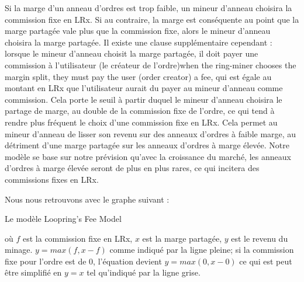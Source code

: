 \documentclass[UTF8,nofonts]{article}
\makeatletter
\newenvironment{figurehere}
 {\def\@captype{figure}}
 {}
\makeatother
\begin{document}
\begin{multicols}{2}
Si la marge d'un anneau d'ordres est trop faible, un mineur d'anneau choisira la commission fixe en LRx. Si au contraire, la marge est conséquente au point que la marge partagée vale plus que la commission fixe, alors le mineur d'anneau choisira la marge partagée. Il existe une clause supplémentaire cependant : lorsque le mineur d'anneau choisit la marge partagée, il doit payer une commission à l'utilisateur (le créateur de l'ordre)when the ring-miner chooses the margin split, they must pay the user (order creator) a fee, qui est égale au montant en LRx que l'utilisateur aurait du payer au mineur d'anneau comme commission. Cela porte le seuil à partir duquel le mineur d'anneau choisira le partage de marge, au double de la commission fixe de l'ordre, ce qui tend à rendre plus fréquent le choix d'une commission fixe en LRx. Cela permet au mineur d'anneau de lisser son revenu sur des anneaux d'ordres à faible marge, au détriment d'une marge partagée sur les anneaux d'ordres à marge élevée. Notre modèle se base sur notre prévision qu'avec la croissance du marché, les anneaux d'ordres à marge élevée seront de plus en plus rares, ce qui incitera des commissions fixes en LRx. 


Nous nous retrouvons avec le graphe suivant :

\begin{center}
\begin{figurehere}
\centering
{}
\caption{Le modèle Loopring's Fee Model}
\label{fig:feemodel}
\end{figurehere}
\end{center}


où $f$ est la commission fixe en LRx, $x$ est la marge partagée, $y$ est le revenu du minage. $y=max(f, x-f)$ comme indiqué par la ligne pleine; si la commission fixe pour l'ordre est de $0$, l'équation devient $y=max(0, x - 0)$ ce qui est peut être simplifié en $y=x$ tel qu'indiqué par la ligne grise.



\end{multicols}
\end{document}
